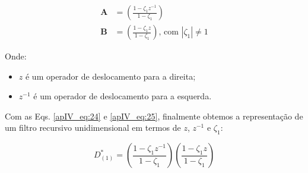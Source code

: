 

\begin{align}
\label{apIV_eq:24}
\mathbf{A} & = \left( \frac{1 - \zeta_{1}z^{-1}}{1 - \zeta_{1}} \right) \\
\label{apIV_eq:25}
\mathbf{B} & = \left( \frac{1 - \zeta_{1}z}{1 - \zeta_{1}} \right) \text{, com $|\zeta_{1}| \neq 1$}
\end{align}

Onde:

\begin{itemize}
	\item $z$ é um operador de deslocamento para a direita;
	\item $z^{-1}$ é um operador de deslocamento para a esquerda.
\end{itemize}

Com as Eqs. \ref{apIV_eq:24} e \ref{apIV_eq:25}, finalmente obtemos a representação de um filtro recursivo unidimensional em termos de $z$, $z^{-1}$ e $\zeta_{1}$:

\begin{equation}
\label{apIV_eq:27}
D^{*}_{(1)} = \left( \frac{1 - \zeta_{1}z^{-1}}{1 - \zeta_{1}}  \right) \left( \frac{1 - \zeta_{1}z}{1 - \zeta_{1}}  \right)
\end{equation}
